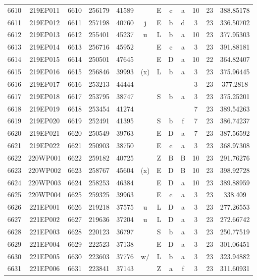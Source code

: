 \begin{tabular}{|*{12}{c|}}
6610 & 219EP011 & 6610 & 256179 & 41589 &  & E & c & a & 10 & 23 & 388.85178 \\ 
6611 & 219EP012 & 6611 & 257198 & 40760 & j & E & b & d & 3 & 23 & 336.50702 \\ 
6612 & 219EP013 & 6612 & 255401 & 45237 & u & L & b & a & 10 & 23 & 377.95303 \\ 
6613 & 219EP014 & 6613 & 256716 & 45952 &  & E & c & a & 3 & 23 & 391.88181 \\ 
6614 & 219EP015 & 6614 & 250501 & 47645 &  & E & D & a & 10 & 22 & 364.82407 \\ 
6615 & 219EP016 & 6615 & 256846 & 39993 & (x) & L & b & a & 3 & 23 & 375.96445 \\ 
6616 & 219EP017 & 6616 & 253213 & 44444 &  &  &  &  & 3 & 23 & 377.2818 \\ 
6617 & 219EP018 & 6617 & 253795 & 38747 &  & S & b & a & 3 & 23 & 375.25201 \\ 
6618 & 219EP019 & 6618 & 253454 & 41274 &  &  &  &  & 7 & 23 & 389.54263 \\ 
6619 & 219EP020 & 6619 & 252491 & 41395 &  & S & b & f & 7 & 23 & 386.74237 \\ 
6620 & 219EP021 & 6620 & 250549 & 39763 &  & E & D & a & 7 & 23 & 387.56592 \\ 
6621 & 219EP022 & 6621 & 250903 & 38750 &  & E & c & a & 3 & 23 & 368.97308 \\ 
6622 & 220WP001 & 6622 & 259182 & 40725 &  & Z & B & B & 10 & 23 & 291.76276 \\ 
6623 & 220WP002 & 6623 & 258767 & 45604 & (x) & E & D & B & 10 & 23 & 398.92728 \\ 
6624 & 220WP003 & 6624 & 258253 & 46384 &  & E & D & a & 10 & 23 & 389.88959 \\ 
6625 & 220WP004 & 6625 & 259325 & 39963 &  & E & c & a & 3 & 23 & 338.409 \\ 
6626 & 221EP001 & 6626 & 219218 & 37575 & u & L & D & a & 3 & 23 & 277.26553 \\ 
6627 & 221EP002 & 6627 & 219636 & 37204 & u & L & D & a & 3 & 23 & 272.66742 \\ 
6628 & 221EP003 & 6628 & 220123 & 36797 &  & S & b & a & 3 & 23 & 250.77519 \\ 
6629 & 221EP004 & 6629 & 222523 & 37138 &  & E & D & a & 3 & 23 & 301.06451 \\ 
6630 & 221EP005 & 6630 & 223603 & 37776 & w/ & L & b & a & 3 & 23 & 323.94882 \\ 
6631 & 221EP006 & 6631 & 223841 & 37143 &  & Z & a & f & 3 & 23 & 311.60931 \\ 

\end{tabular}
